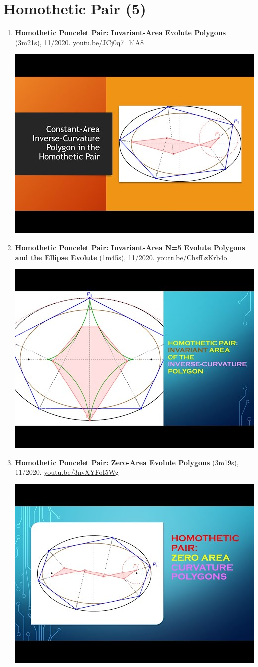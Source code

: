 \documentclass[12pt]{article}
\begin{document}
\section{Homothetic Pair (5)}

\begin{enumerate}[resume]
\item \textbf{Homothetic Poncelet Pair: Invariant-Area Evolute Polygons} (3m21s), 11/2020. \href{https://youtu.be/JCj0q7_hlA8}{\url{youtu.be/JCj0q7\_hlA8}}
\begin{center}\includegraphics[width=.5\textwidth]{pics/JCj0q7_hlA8.jpg}\end{center}
% 
\item \textbf{Homothetic Poncelet Pair: Invariant-Area N=5 Evolute Polygons and the Ellipse Evolute} (1m45s), 11/2020. \href{https://youtu.be/ChsfLzKrb4o}{\url{youtu.be/ChsfLzKrb4o}}
\begin{center}\includegraphics[width=.5\textwidth]{pics/ChsfLzKrb4o.jpg}\end{center}
% 
\item \textbf{Homothetic Poncelet Pair: Zero-Area Evolute Polygons} (3m19s), 11/2020. \href{https://youtu.be/3nvXYFoI5Wg}{\url{youtu.be/3nvXYFoI5Wg}}
\begin{center}\includegraphics[width=.5\textwidth]{pics/3nvXYFoI5Wg.jpg}\end{center}

\end{enumerate}
\end{document}
